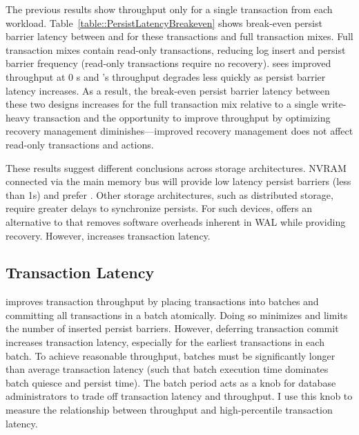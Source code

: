 

The previous results show throughput only for a single transaction from each workload.
Table~\ref{table::PersistLatencyBreakeven} shows break-even persist barrier latency between \NVDisk and \InPlace for these transactions and full transaction mixes.
Full transaction mixes contain read-only transactions, reducing log insert and persist barrier frequency (read-only transactions require no recovery).
\NVDisk sees improved throughput at 0 \textmu s and \InPlace's throughput degrades less quickly as persist barrier latency increases.
As a result, the break-even persist barrier latency between these two designs increases for the full transaction mix relative to a single write-heavy transaction and the opportunity to improve throughput by optimizing recovery management diminishes---improved recovery management does not affect read-only transactions and actions.

These results suggest different conclusions across storage architectures.
NVRAM connected via the main memory bus will provide low latency persist barriers (less than 1\textmu s) and prefer \InPlace.
Other storage architectures, such as distributed storage, require greater delays to synchronize persists.
For such devices, \GroupCommit offers an alternative to \NVDisk that removes software overheads inherent in WAL while providing recovery.
However, \GroupCommit increases transaction latency.

\subsection{Transaction Latency}
\label{sec:OLTP_eval:Persists:XctLatency}



\GroupCommit improves transaction throughput by placing transactions into batches and committing all transactions in a batch atomically.
Doing so minimizes and limits the number of inserted persist barriers.
However, deferring transaction commit increases transaction latency, especially for the earliest transactions in each batch.
To achieve reasonable throughput, batches must be significantly longer than average transaction latency (such that batch execution time dominates batch quiesce and persist time).
The batch period acts as a knob for database administrators to trade off transaction latency and throughput.
I use this knob to measure the relationship between throughput and high-percentile transaction latency.

